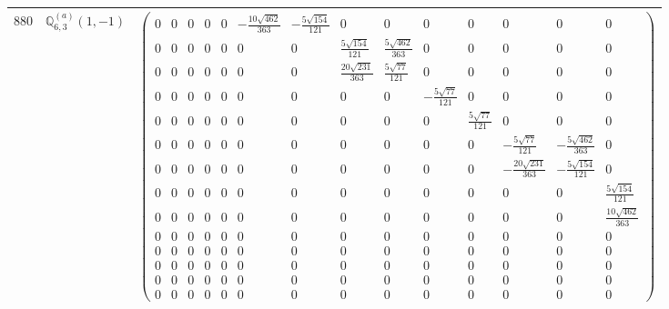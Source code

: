 \documentclass[fleqn,8pt,landscape]{jsarticle}
\begin{document}
\begin{center}
\begin{longtable}{ccc}
$ 880 $ & $ \mathbb{Q}_{6,3}^{(a)}(1,-1) $ & $ \begin{pmatrix} 0 & 0 & 0 & 0 & 0 & - \frac{10 \sqrt{462}}{363} & - \frac{5 \sqrt{154}}{121} & 0 & 0 & 0 & 0 & 0 & 0 & 0 \\ 0 & 0 & 0 & 0 & 0 & 0 & 0 & \frac{5 \sqrt{154}}{121} & \frac{5 \sqrt{462}}{363} & 0 & 0 & 0 & 0 & 0 \\ 0 & 0 & 0 & 0 & 0 & 0 & 0 & \frac{20 \sqrt{231}}{363} & \frac{5 \sqrt{77}}{121} & 0 & 0 & 0 & 0 & 0 \\ 0 & 0 & 0 & 0 & 0 & 0 & 0 & 0 & 0 & - \frac{5 \sqrt{77}}{121} & 0 & 0 & 0 & 0 \\ 0 & 0 & 0 & 0 & 0 & 0 & 0 & 0 & 0 & 0 & \frac{5 \sqrt{77}}{121} & 0 & 0 & 0 \\ 0 & 0 & 0 & 0 & 0 & 0 & 0 & 0 & 0 & 0 & 0 & - \frac{5 \sqrt{77}}{121} & - \frac{5 \sqrt{462}}{363} & 0 \\ 0 & 0 & 0 & 0 & 0 & 0 & 0 & 0 & 0 & 0 & 0 & - \frac{20 \sqrt{231}}{363} & - \frac{5 \sqrt{154}}{121} & 0 \\ 0 & 0 & 0 & 0 & 0 & 0 & 0 & 0 & 0 & 0 & 0 & 0 & 0 & \frac{5 \sqrt{154}}{121} \\ 0 & 0 & 0 & 0 & 0 & 0 & 0 & 0 & 0 & 0 & 0 & 0 & 0 & \frac{10 \sqrt{462}}{363} \\ 0 & 0 & 0 & 0 & 0 & 0 & 0 & 0 & 0 & 0 & 0 & 0 & 0 & 0 \\ 0 & 0 & 0 & 0 & 0 & 0 & 0 & 0 & 0 & 0 & 0 & 0 & 0 & 0 \\ 0 & 0 & 0 & 0 & 0 & 0 & 0 & 0 & 0 & 0 & 0 & 0 & 0 & 0 \\ 0 & 0 & 0 & 0 & 0 & 0 & 0 & 0 & 0 & 0 & 0 & 0 & 0 & 0 \\ 0 & 0 & 0 & 0 & 0 & 0 & 0 & 0 & 0 & 0 & 0 & 0 & 0 & 0 \end{pmatrix} $ \\ \hline

\end{longtable}
\end{center}
\end{document}
